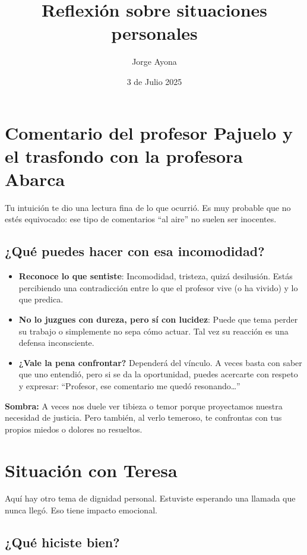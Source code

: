 \documentclass[12pt]{article}
\title{Reflexión sobre situaciones personales}
\author{Jorge Ayona}
\date{3 de Julio 2025}
\begin{document}
	
	\maketitle
	
	\section{Comentario del profesor Pajuelo y el trasfondo con la profesora Abarca}
	
	Tu intuición te dio una lectura fina de lo que ocurrió. Es muy probable que no estés equivocado: ese tipo de comentarios “al aire” no suelen ser inocentes.
	
	\subsection*{¿Qué puedes hacer con esa incomodidad?}
	
	\begin{itemize}
		\item \textbf{Reconoce lo que sentiste}: Incomodidad, tristeza, quizá desilusión. Estás percibiendo una contradicción entre lo que el profesor vive (o ha vivido) y lo que predica.
		\item \textbf{No lo juzgues con dureza, pero sí con lucidez}: Puede que tema perder su trabajo o simplemente no sepa cómo actuar. Tal vez su reacción es una defensa inconsciente.
		\item \textbf{¿Vale la pena confrontar?} Dependerá del vínculo. A veces basta con saber que uno entendió, pero si se da la oportunidad, puedes acercarte con respeto y expresar: ``Profesor, ese comentario me quedó resonando…''
	\end{itemize}
	
	\textbf{Sombra:} A veces nos duele ver tibieza o temor porque proyectamos nuestra necesidad de justicia. Pero también, al verlo temeroso, te confrontas con tus propios miedos o dolores no resueltos.
	
	\section{Situación con Teresa}
	
	Aquí hay otro tema de dignidad personal. Estuviste esperando una llamada que nunca llegó. Eso tiene impacto emocional.
	
	\subsection*{¿Qué hiciste bien?}
	
\end{document}
